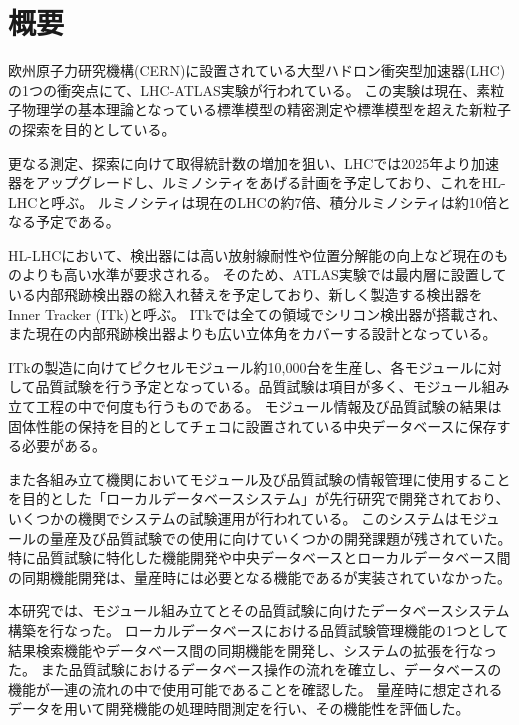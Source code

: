 \chapter*{概要}

欧州原子力研究機構(CERN)に設置されている大型ハドロン衝突型加速器(LHC)の1つの衝突点にて、LHC-ATLAS実験が行われている。
この実験は現在、素粒子物理学の基本理論となっている標準模型の精密測定や標準模型を超えた新粒子の探索を目的としている。

更なる測定、探索に向けて取得統計数の増加を狙い、LHCでは2025年より加速器をアップグレードし、ルミノシティをあげる計画を予定しており、これをHL-LHCと呼ぶ。
ルミノシティは現在のLHCの約7倍、積分ルミノシティは約10倍となる予定である。

HL-LHCにおいて、検出器には高い放射線耐性や位置分解能の向上など現在のものよりも高い水準が要求される。
そのため、ATLAS実験では最内層に設置している内部飛跡検出器の総入れ替えを予定しており、新しく製造する検出器をInner Tracker (ITk)と呼ぶ。
ITkでは全ての領域でシリコン検出器が搭載され、また現在の内部飛跡検出器よりも広い立体角をカバーする設計となっている。

ITkの製造に向けてピクセルモジュール約10,000台を生産し、各モジュールに対して品質試験を行う予定となっている。品質試験は項目が多く、モジュール組み立て工程の中で何度も行うものである。
モジュール情報及び品質試験の結果は固体性能の保持を目的としてチェコに設置されている中央データベースに保存する必要がある。

また各組み立て機関においてモジュール及び品質試験の情報管理に使用することを目的とした「ローカルデータベースシステム」が先行研究で開発されており、いくつかの機関でシステムの試験運用が行われている。
このシステムはモジュールの量産及び品質試験での使用に向けていくつかの開発課題が残されていた。
特に品質試験に特化した機能開発や中央データベースとローカルデータベース間の同期機能開発は、量産時には必要となる機能であるが実装されていなかった。

本研究では、モジュール組み立てとその品質試験に向けたデータベースシステム構築を行なった。
ローカルデータベースにおける品質試験管理機能の1つとして結果検索機能やデータベース間の同期機能を開発し、システムの拡張を行なった。
また品質試験におけるデータベース操作の流れを確立し、データベースの機能が一連の流れの中で使用可能であることを確認した。
量産時に想定されるデータを用いて開発機能の処理時間測定を行い、その機能性を評価した。


